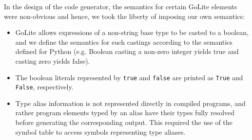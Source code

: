 \documentclass{article}
\begin{document}
In the design of the code generator, the semantics for certain GoLite elements were non-obvious and hence, we took the liberty of imposing our own semantics:
\begin{itemize}
\item GoLite allows expressions of a non-string base type to be casted to a boolean, and we define the semantics for such castings according to the semantics defined for Python (e.g. Boolean casting a non-zero integer yields true and casting zero yields false).
\item The boolean literals represented by \texttt{true} and \texttt{false} are printed as \texttt{True} and \texttt{False}, respectively.
\item Type alias information is not represented directly in compiled programs, and rather program elements typed by an alias have their types fully resolved before generating the corresponding output. This required the use of the symbol table to access symbols representing type aliases.
\end{itemize}
\end{document}
